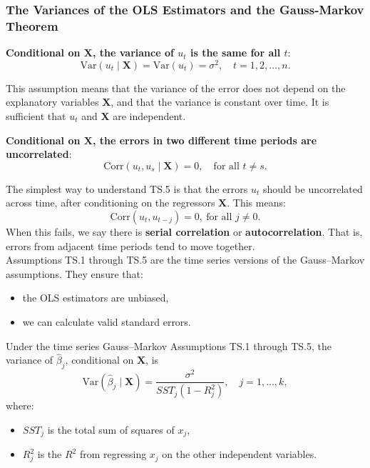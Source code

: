 \documentclass[a4paper, 10pt]{article}
\theoremstyle{definition}	%
\begin{document}
\subsubsection{The Variances of the OLS Estimators and the Gauss-Markov Theorem}
\begin{tcolorbox}[colback=blue!5!white, colframe=blue!80!black, title=Assumption TS.4 -- Homoskedasticity]
\textbf{Conditional on \( \mathbf{X} \), the variance of \( u_t \) is the same for all \( t \)}:
\[
\text{Var}(u_t \mid \mathbf{X}) = \text{Var}(u_t) = \sigma^2, \quad t = 1, 2, \dots, n.
\]
\end{tcolorbox}
This assumption means that the variance of the error does not depend on the explanatory variables \( \mathbf{X} \), and that the variance is constant over time. It is sufficient that $u_t$ and $\mathbf{X}$ are independent.
\begin{tcolorbox}[colback=blue!5!white, colframe=blue!80!black, title=Assumption TS.5 -- No Serial Correlation]
\textbf{Conditional on \( \mathbf{X} \), the errors in two different time periods are uncorrelated}:
\[
\text{Corr}(u_t, u_s \mid \mathbf{X}) = 0, \quad \text{for all } t \ne s.
\]
\end{tcolorbox}
The simplest way to understand TS.5 is that the errors \( u_t \) should be uncorrelated across time, after conditioning on the regressors \( \mathbf{X} \). This means:
\begin{equation}
    \mathrm{Corr}(u_t, u_{t-j}) = 0, \ \text{for all } j \ne 0. \label{p.342,10.12}
\end{equation}
When this fails, we say there is \textbf{serial correlation} or \textbf{autocorrelation}. That is, errors from adjacent time periods tend to move together.\\
Assumptions TS.1 through TS.5 are the time series versions of the Gauss–Markov assumptions. They ensure that:
\begin{itemize}
  \item the OLS estimators are unbiased,
  \item we can calculate valid standard errors.
\end{itemize}
\begin{tcolorbox}[colback=blue!5!white, colframe=blue!80!black, title=Theorem 10.2 -- OLS Sampling Variances]
Under the time series Gauss–Markov Assumptions TS.1 through TS.5, the variance of \( \hat{\beta}_j \), conditional on \( \mathbf{X} \), is
\begin{equation}
\text{Var}(\hat{\beta}_j \mid \mathbf{X}) = \frac{\sigma^2}{SST_j(1 - R_j^2)}, \quad j = 1, \dots, k, \label{p.343,10.13}
\end{equation}
where:
\begin{itemize}
  \item \( SST_j \) is the total sum of squares of \( x_j \),
  \item \( R_j^2 \) is the \( R^2 \) from regressing \( x_j \) on the other independent variables.
\end{itemize}
\end{tcolorbox}
\end{document}
